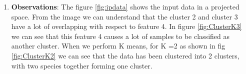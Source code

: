 \documentclass[10pt, letterpaper]{article}
\begin{document}
\begin{enumerate}
\item \textbf{Observations}: The figure \ref{fig:ipdata} shows the input data in a projected space. From the image we can understand that the cluster 2 and cluster 3 have a lot of overlapping with respect to feature 4. In figure \ref{fig:ClusterK3} we can see that this feature 4 causes a lot of samples to be classified as another cluster. When we perform K means, for K =2  as shown in fig \ref{fig:ClusterK2} we can see that the data has been clustered into 2 clusters, with two species together forming one cluster. 




\end{enumerate}
\end{document}
